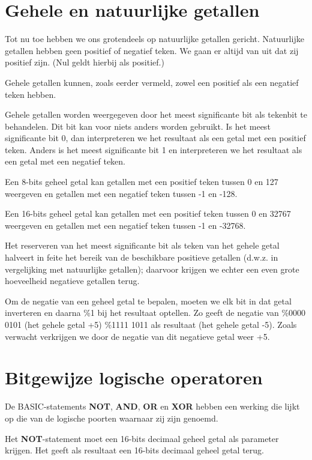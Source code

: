 \section{Gehele en natuurlijke getallen}Tot nu toe hebben we ons grotendeels op natuurlijke getallen gericht. Natuurlijke getallen hebben geen positief of negatief teken. We gaan er altijd van uit dat zij positief zijn. (Nul geldt hierbij als positief.)

Gehele getallen kunnen, zoals eerder vermeld, zowel een positief als een negatief teken hebben.

Gehele getallen worden weergegeven door het meest significante bit als tekenbit te behandelen. Dit bit kan voor niets anders worden gebruikt. Is het meest significante bit 0, dan interpreteren we het resultaat als een getal met een positief teken. Anders is het meest significante bit 1 en interpreteren we het resultaat als een getal met een negatief teken.

Een 8-bits geheel getal kan getallen met een positief teken tussen 0 en 127 weergeven en getallen met een negatief teken tussen -1 en -128.

Een 16-bits geheel getal kan getallen met een positief teken tussen 0 en 32767 weergeven en getallen met een negatief teken tussen -1 en -32768.

Het reserveren van het meest significante bit als teken van het gehele getal halveert in feite het bereik van de beschikbare positieve getallen (d.w.z. in vergelijking met natuurlijke getallen); daarvoor krijgen we echter een even grote hoeveelheid negatieve getallen terug.

Om de negatie van een geheel getal te bepalen, moeten we elk bit in dat getal inverteren en daarna \%1 bij het resultaat optellen. Zo geeft de negatie van \%0000 0101 (het gehele getal +5) \%1111 1011 als resultaat (het gehele getal -5). Zoals verwacht verkrijgen we door de negatie van dit negatieve getal weer +5.

\section{Bitgewijze logische operatoren}

De BASIC-statements {\bf NOT}, {\bf AND}, {\bf OR} en {\bf XOR} hebben een werking die lijkt op die van de logische poorten waarnaar zij zijn genoemd.

Het {\bf NOT}-statement moet een 16-bits decimaal geheel getal als parameter krijgen. Het geeft als resultaat een 16-bits decimaal geheel getal terug.

